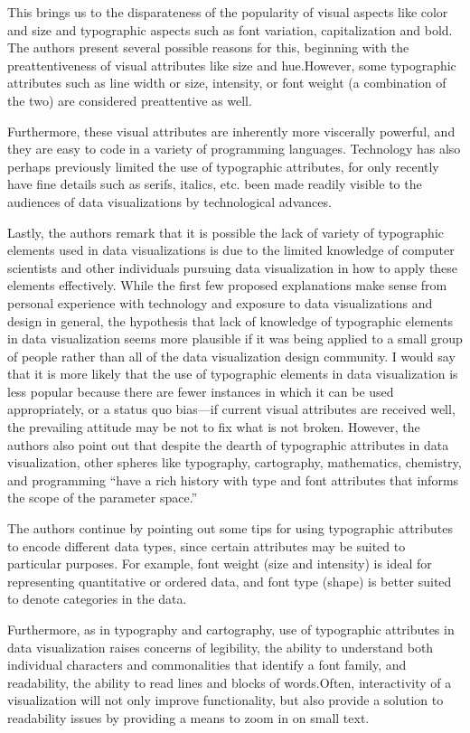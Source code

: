 \documentclass[]{book}
\theoremstyle{definition}
\theoremstyle{definition}
\theoremstyle{definition}
\theoremstyle{remark}
\begin{document}
This brings us to the disparateness of the popularity of visual aspects
like color and size and typographic aspects such as font variation,
capitalization and bold. The authors present several possible reasons
for this, beginning with the preattentiveness of visual attributes like
size and hue.However, some typographic attributes such as line width or
size, intensity, or font weight (a combination of the two) are
considered preattentive as well.

Furthermore, these visual attributes are inherently more viscerally
powerful, and they are easy to code in a variety of programming
languages. Technology has also perhaps previously limited the use of
typographic attributes, for only recently have fine details such as
serifs, italics, etc. been made readily visible to the audiences of data
visualizations by technological advances.

Lastly, the authors remark that it is possible the lack of variety of
typographic elements used in data visualizations is due to the limited
knowledge of computer scientists and other individuals pursuing data
visualization in how to apply these elements effectively. While the
first few proposed explanations make sense from personal experience with
technology and exposure to data visualizations and design in general,
the hypothesis that lack of knowledge of typographic elements in data
visualization seems more plausible if it was being applied to a small
group of people rather than all of the data visualization design
community. I would say that it is more likely that the use of
typographic elements in data visualization is less popular because there
are fewer instances in which it can be used appropriately, or a status
quo bias---if current visual attributes are received well, the
prevailing attitude may be not to fix what is not broken. However, the
authors also point out that despite the dearth of typographic attributes
in data visualization, other spheres like typography, cartography,
mathematics, chemistry, and programming ``have a rich history with type
and font attributes that informs the scope of the parameter space.''

The authors continue by pointing out some tips for using typographic
attributes to encode different data types, since certain attributes may
be suited to particular purposes. For example, font weight (size and
intensity) is ideal for representing quantitative or ordered data, and
font type (shape) is better suited to denote categories in the data.

Furthermore, as in typography and cartography, use of typographic
attributes in data visualization raises concerns of legibility, the
ability to understand both individual characters and commonalities that
identify a font family, and readability, the ability to read lines and
blocks of words.Often, interactivity of a visualization will not only
improve functionality, but also provide a solution to readability issues
by providing a means to zoom in on small text.
\end{document}

